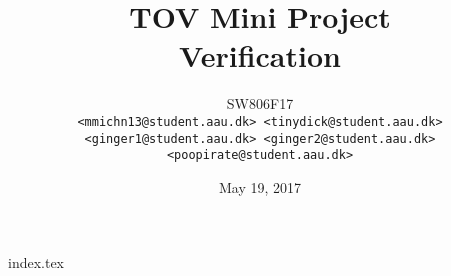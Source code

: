 \documentclass[12pt,a4paper,article,oneside]{memoir}
\title{TOV Mini Project\\Verification}
\author{SW806F17\\
\footnotesize\texttt{<mmichn13@student.aau.dk> <tinydick@student.aau.dk> <ginger1@student.aau.dk> <ginger2@student.aau.dk> <poopirate@student.aau.dk>}}
\date{May 19, 2017}
\begin{document}
\maketitle
{index.tex}
\end{document}
